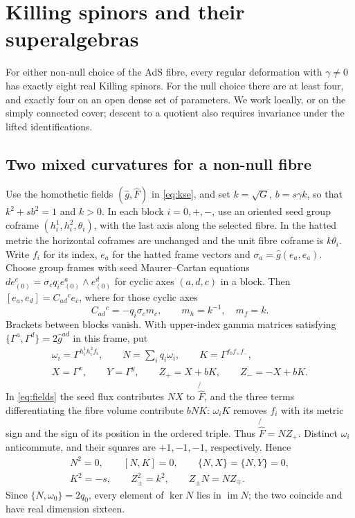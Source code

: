 \section{Killing spinors and their superalgebras}\label{sec:spin}
For either non-null choice of the AdS fibre, every regular deformation with
$\gamma\ne0$ has exactly eight real Killing spinors. For the null choice
there are at least four, and exactly four on an open dense set of parameters.
We work locally, or on the simply connected cover; descent to a quotient
also requires invariance under the lifted identifications.

\subsection{Two mixed curvatures for a non-null fibre}
Use the homothetic fields $(\hat g,\hat F)$ in \eqref{eq:kse}, and set
$k=\sqrt G$, $b=s\gamma k$, so that $k^2+s b^2=1$ and $k>0$.
In each block $i=0,+,-$, use an oriented seed group coframe
$(h_i^1,h_i^2,\theta_i)$, with the last axis along the selected fibre.
In the hatted metric the horizontal coframes are unchanged and the unit
fibre coframe is $k\theta_i$. Write $f_i$ for its index, $e_a$ for the
hatted frame vectors and $\sigma_a=\hat g(e_a,e_a)$. Choose group frames
with seed Maurer--Cartan equations $d e_{(0)}^c=\sigma_c q_i
 e_{(0)}^a\wedge e_{(0)}^d$ for cyclic axes $(a,d,c)$ in a block.
Then $[e_a,e_d]=C_{ad}{}^c e_c$, where for those cyclic axes
\[
 C_{ad}{}^c=-q_i\sigma_c m_c,\qquad m_h=k^{-1},\quad m_f=k .
\]
Brackets between blocks vanish. With upper-index gamma matrices satisfying
$\{\Gamma^a,\Gamma^d\}=2\hat g^{ad}$ in this frame, put
\[
 \begin{gathered}
 \omega_i=\Gamma^{h_i^1h_i^2f_i},\qquad N=\sum_i q_i\omega_i,\qquad K=\Gamma^{f_0f_+f_-},\\
 X=\Gamma^x,\qquad Y=\Gamma^y,\qquad Z_+=X+bK,\qquad Z_-=-X+bK .
 \end{gathered}
\]
In \eqref{eq:fields} the seed flux contributes $NX$ to
$\not{\hat F}$, and the three terms differentiating the fibre volume
contribute $bNK$: $\omega_i K$ removes $f_i$ with its metric sign
and the sign of its position in the ordered triple. Thus
$\not{\hat F}=NZ_+$. Distinct $\omega_i$ anticommute, and their squares
are $+1,-1,-1$, respectively. Hence
\[
 \begin{gathered}
 N^2=0,\qquad [N,K]=0,\qquad \{N,X\}=\{N,Y\}=0,\\
 K^2=-s,\qquad Z_\pm^2=k^2,\qquad Z_\pm N=NZ_\mp .
 \end{gathered}
\]
Since $\{N,\omega_0\}=2q_0$, every element of $\ker N$ lies in
$\operatorname{im}N$; the two coincide and have real dimension sixteen.


